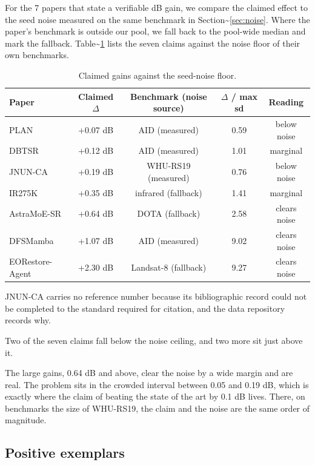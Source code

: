 \documentclass[pdflatex,sn-nature]{sn-jnl}
\newlength{\tblavail}
\begin{document}
For the 7 papers that state a verifiable dB gain, we compare the claimed effect to the seed noise measured on the same benchmark in Section\textasciitilde{}\ref{sec:noise}. Where the paper's benchmark is outside our pool, we fall back to the pool-wide median and mark the fallback. Table\textasciitilde{}\ref{tab:gains} lists the seven claims against the noise floor of their own benchmarks.

\begin{table}[htbp]
\centering
\small
\setlength{\tabcolsep}{3pt}
\setlength{\tblavail}{\dimexpr\textwidth-10\tabcolsep\relax}
\begin{tabular}{lcccc}
\hline
Paper & Claimed $\Delta$ & Benchmark (noise source) & $\Delta$ / max sd & Reading \\
\hline
PLAN \cite{ref11} & +0.07 dB & AID (measured) & 0.59 & below noise \\
DBTSR \cite{ref12} & +0.12 dB & AID (measured) & 1.01 & marginal \\
JNUN-CA & +0.19 dB & WHU-RS19 (measured) & 0.76 & below noise \\
IR275K \cite{ref13} & +0.35 dB & infrared (fallback) & 1.41 & marginal \\
AstraMoE-SR \cite{ref14} & +0.64 dB & DOTA (fallback) & 2.58 & clears noise \\
DFSMamba \cite{ref15} & +1.07 dB & AID (measured) & 9.02 & clears noise \\
EORestore-Agent \cite{ref9} & +2.30 dB & Landsat-8 (fallback) & 9.27 & clears noise \\
\hline
\end{tabular}
\caption{Claimed gains against the seed-noise floor.}\label{tab:gains}
\end{table}

JNUN-CA carries no reference number because its bibliographic record could not be completed to the standard required for citation, and the data repository records why.

Two of the seven claims fall below the noise ceiling, and two more sit just above it.

The large gains, 0.64 dB and above, clear the noise by a wide margin and are real. The problem sits in the crowded interval between 0.05 and 0.19 dB, which is exactly where the claim of beating the state of the art by 0.1 dB lives. There, on benchmarks the size of WHU-RS19, the claim and the noise are the same order of magnitude.

\subsection{Positive exemplars}\label{sec:exemplars}
\end{document}
